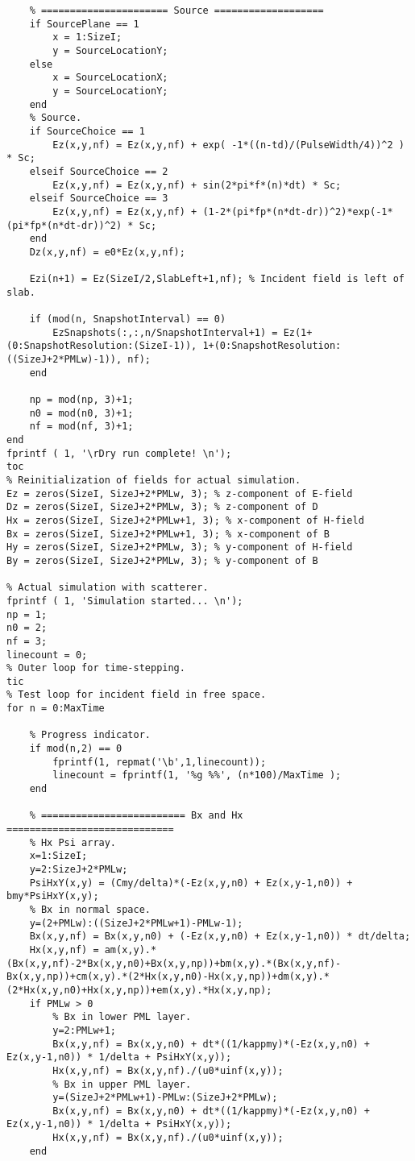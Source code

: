 \begin{lstlisting}
    % ====================== Source ===================
    if SourcePlane == 1
        x = 1:SizeI;
        y = SourceLocationY;        
    else
        x = SourceLocationX;
        y = SourceLocationY;
    end
    % Source.
    if SourceChoice == 1
        Ez(x,y,nf) = Ez(x,y,nf) + exp( -1*((n-td)/(PulseWidth/4))^2 ) * Sc;
    elseif SourceChoice == 2
        Ez(x,y,nf) = Ez(x,y,nf) + sin(2*pi*f*(n)*dt) * Sc;
    elseif SourceChoice == 3
        Ez(x,y,nf) = Ez(x,y,nf) + (1-2*(pi*fp*(n*dt-dr))^2)*exp(-1*(pi*fp*(n*dt-dr))^2) * Sc;
    end
    Dz(x,y,nf) = e0*Ez(x,y,nf);

    Ezi(n+1) = Ez(SizeI/2,SlabLeft+1,nf); % Incident field is left of slab.
    
    if (mod(n, SnapshotInterval) == 0)
        EzSnapshots(:,:,n/SnapshotInterval+1) = Ez(1+(0:SnapshotResolution:(SizeI-1)), 1+(0:SnapshotResolution:((SizeJ+2*PMLw)-1)), nf);
    end

    np = mod(np, 3)+1;
    n0 = mod(n0, 3)+1;
    nf = mod(nf, 3)+1;
end
fprintf ( 1, '\rDry run complete! \n');
toc
% Reinitialization of fields for actual simulation.
Ez = zeros(SizeI, SizeJ+2*PMLw, 3); % z-component of E-field
Dz = zeros(SizeI, SizeJ+2*PMLw, 3); % z-component of D
Hx = zeros(SizeI, SizeJ+2*PMLw+1, 3); % x-component of H-field
Bx = zeros(SizeI, SizeJ+2*PMLw+1, 3); % x-component of B
Hy = zeros(SizeI, SizeJ+2*PMLw, 3); % y-component of H-field
By = zeros(SizeI, SizeJ+2*PMLw, 3); % y-component of B

% Actual simulation with scatterer.
fprintf ( 1, 'Simulation started... \n');
np = 1;
n0 = 2;
nf = 3;
linecount = 0;
% Outer loop for time-stepping.
tic
% Test loop for incident field in free space.
for n = 0:MaxTime

    % Progress indicator.
    if mod(n,2) == 0
        fprintf(1, repmat('\b',1,linecount));
        linecount = fprintf(1, '%g %%', (n*100)/MaxTime );
    end

    % ========================= Bx and Hx =============================
    % Hx Psi array.
    x=1:SizeI;
    y=2:SizeJ+2*PMLw;
    PsiHxY(x,y) = (Cmy/delta)*(-Ez(x,y,n0) + Ez(x,y-1,n0)) + bmy*PsiHxY(x,y);
    % Bx in normal space.
    y=(2+PMLw):((SizeJ+2*PMLw+1)-PMLw-1);
    Bx(x,y,nf) = Bx(x,y,n0) + (-Ez(x,y,n0) + Ez(x,y-1,n0)) * dt/delta;
    Hx(x,y,nf) = am(x,y).*(Bx(x,y,nf)-2*Bx(x,y,n0)+Bx(x,y,np))+bm(x,y).*(Bx(x,y,nf)-Bx(x,y,np))+cm(x,y).*(2*Hx(x,y,n0)-Hx(x,y,np))+dm(x,y).*(2*Hx(x,y,n0)+Hx(x,y,np))+em(x,y).*Hx(x,y,np);
    if PMLw > 0
        % Bx in lower PML layer.
        y=2:PMLw+1;
        Bx(x,y,nf) = Bx(x,y,n0) + dt*((1/kappmy)*(-Ez(x,y,n0) + Ez(x,y-1,n0)) * 1/delta + PsiHxY(x,y));
        Hx(x,y,nf) = Bx(x,y,nf)./(u0*uinf(x,y));
        % Bx in upper PML layer.
        y=(SizeJ+2*PMLw+1)-PMLw:(SizeJ+2*PMLw);
        Bx(x,y,nf) = Bx(x,y,n0) + dt*((1/kappmy)*(-Ez(x,y,n0) + Ez(x,y-1,n0)) * 1/delta + PsiHxY(x,y));
        Hx(x,y,nf) = Bx(x,y,nf)./(u0*uinf(x,y));
    end


\end{lstlisting}
